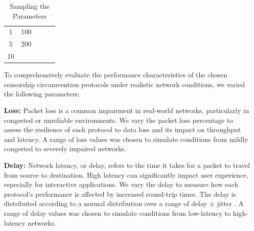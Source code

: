 \begin{table}[tbh]
\begin{tabular}{ccccc}
		\rowcolor[HTML]{EFEFEF}
		1                                                                & 100                                                               &                                                                    &                                                                       &                                                                             \\
		\rowcolor[HTML]{FFFFFF}
		5                                                                & 200                                                               &                                                                    &                                                                       &                                                                             \\
		\rowcolor[HTML]{EFEFEF}
		10                                                               &                                                                   &                                                                    &                                                                       &                                                                             \\ \bottomrule
	\end{tabular}
	\caption{Sampling the Parameters}
	\label{tab:parameters}
\end{table}

To comprehensively evaluate the performance characteristics of the chosen censorship circumvention protocols under realistic network conditions, we varied the following parameters:

\noindent\textbf{Loss:} Packet loss is a common impairment in real-world networks, particularly in congested or unreliable environments.
We vary the packet loss percentage to assess the resilience of each protocol to data loss and its impact on throughput and latency.
A range of loss values was chosen to simulate conditions from mildly congested to severely impaired networks.

\noindent\textbf{Delay:} Network latency, or delay, refers to the time it takes for a packet to travel from source to destination.
High latency can significantly impact user experience, especially for interactive applications.
We vary the delay to measure how each protocol's performance is affected by increased round-trip times.
The delay is distributed according to a normal distribution over a range of delay ± jitter \cite{man8:tc-netem}.
A range of delay values was chosen to simulate conditions from low-latency to high-latency networks.

